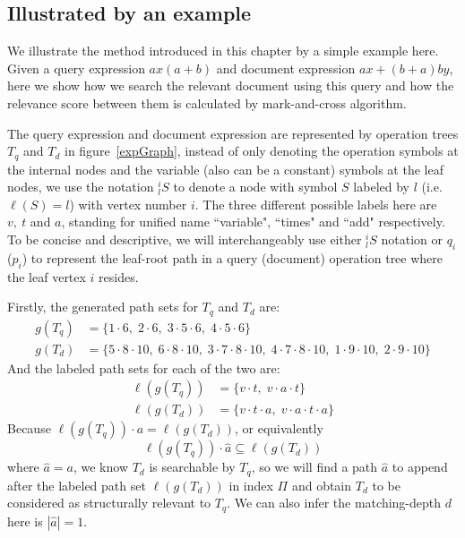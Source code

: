 \subsection{Illustrated by an example}
\label{secIllu}

We illustrate the method introduced in this chapter by a simple example here. 
Given a query expression $ax(a+b)$ and document expression $ax + (b+a)by$, here we show how we search the relevant document using this query and how the relevance score between them is calculated by mark-and-cross algorithm.

The query expression and document expression are represented by operation trees $T_q$ and $T_d$ in figure~\ref{expGraph}, 
instead of only denoting the operation symbols at the internal nodes and the variable (also can be a constant) symbols at the leaf nodes, we use the notation $^i_l S$ to denote a node with symbol $S$ labeled by $l$ (i.e. $\ell(S)=l$) with vertex number $i$. 
The three different possible labels here are $v,\ t$ and $a$, standing for unified name ``variable", ``times" and ``add" respectively.
To be concise and descriptive, we will interchangeably use either $^i_l S$ notation or $q_i$ ($p_i$) to represent the leaf-root path in a query (document) operation tree where the leaf vertex $i$ resides.

Firstly, the generated path sets for $T_q$ and $T_d$ are:
$$
\begin{aligned}
g(T_q) &= \{ 1\cdot6,\; 2\cdot6,\; 3\cdot5\cdot6,\; 4\cdot5\cdot6\} \\
g(T_d) &= \{ 5\cdot8\cdot10,\; 6\cdot8\cdot10,\; 3\cdot7\cdot8\cdot10,\; 4\cdot7\cdot8\cdot10,\; 1\cdot9\cdot10,\; 2\cdot9\cdot10\}
\end{aligned}
$$
And the labeled path sets for each of the two are:
$$
\begin{aligned}
\ell\left(g(T_q)\right) &= \{ v\cdot t,\; v\cdot a\cdot t \} \\
\ell\left(g(T_d)\right) &= \{ v\cdot t\cdot a,\; v\cdot a\cdot t \cdot a \}
\end{aligned}
$$
Because $\ell\left(g(T_q)\right) \cdot a = \ell\left(g(T_d)\right)$, or equivalently 
$$
\ell(g(T_q)) \cdot \hat{a} \subseteq \ell(g(T_d))
$$
where $\hat{a} = a$, 
we know $T_d$ is searchable by $T_q$, so we will find a path $\hat{a}$ to append after the labeled path set $\ell\left(g(T_d)\right)$ in index $\Pi$ and obtain $T_d$ to be considered as structurally relevant to $T_q$.
We can also infer the matching-depth $d$ here is $|\hat{a}| = 1$. 

